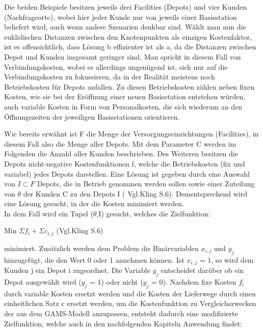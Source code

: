 \documentclass[a4paper,12pt,parskip,bibtotoc,liststotoc]{article}
\begin{document}
Die beiden Beispiele besitzen jeweils drei Facilities (Depots) und vier Kunden (Nachfrageorte), wobei hier jeder Kunde nur von jeweils einer Basisstation beliefert wird, auch wenn andere Szenarien denkbar sind.
Wählt man nun die euklidischen Distanzen zwischen den Knotenpunkten als einzigen Kostenfaktor, ist es offensichtlich, dass Lösung b effizienter ist als a, da die Distanzen zwischen Depot und Kunden insgesamt geringer sind. 
Man spricht in diesem Fall von Verbindungskosten, wobei es allerdings ungenügend ist, sich nur auf die Verbindungskosten zu fokussieren, da in der Realität meistens noch Betriebskosten für Depots anfallen.
Zu diesen Betriebskosten zählen neben fixen Kosten, wie sie bei der Eröffnung einer neuen Basisstation entstehen würden, auch variable Kosten in Form von Personalkosten, die sich wiederum an den Öffnungszeiten der jeweiligen Basisstationen orientieren.

Wie bereits erwähnt ist F die Menge der Versorgungseinrichtungen (Facilities), in diesem Fall also die Menge aller Depots. 
Mit dem Parameter C werden im Folgenden die Anzahl aller Kunden beschrieben. 
Des Weiteren besitzen die Depots nicht-negative Kostenfunktionen f, welche die Betriebskosten (fix und variabel) jedes Depots darstellen. 
Eine Lösung ist gegeben durch eine Auswahl von $I \subset  F$ Depots, die in Betrieb genommen werden sollen sowie einer Zuteilung von $\theta$ der Kunden C zu den Depots I ( Vgl.Kling S.6).
Dementsprechend wird eine Lösung gesucht, in der die Kosten minimiert werden.\\

In dem Fall wird ein Tupel ($\theta$,I) gesucht, welches die Zielfunktion:

\begin{center}
Min $\Sigma f_{i}  + \Sigma c_{i,j}$ (Vgl.Kling S.6)
\end{center}
 
minimiert.
Zusätzlich werden dem Problem die Binärvariablen $x_{i,j}$ und $y_{j}$ hinzugefügt, die den Wert 0 oder 1 annehmen können. Ist $x_{i,j}$ = 1, so wird dem Kunden j ein Depot i zugeordnet. 
Die Variable  $y_{j}$ entscheidet darüber ob ein Depot ausgewählt wird ($y_{j}$ = 1) oder nicht ($y_{j}$ = 0). 
Nachdem fixe Kosten $f_{i}$ durch variable Kosten ersetzt werden und die Kosten der Lieferwege durch einen einheitlichen Satz c ersetzt werden, um die Kostenfunktion zu Vergleichszwecken der aus dem GAMS-Modell anzupassen, entsteht dadurch eine modifizierte Zielfunktion, welche auch in den nachfolgenden Kapiteln Anwendung findet:
\end{document}
